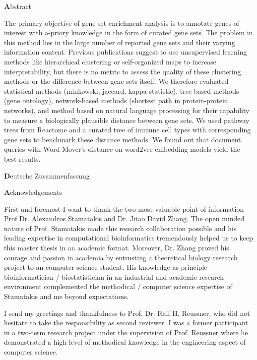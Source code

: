 \documentclass{thesisclass}
\begin{document}
\begin{addmargin}{0.5cm}

\centerline{\textbf Abstract}

The primary objective of gene set enrichment analysis is to annotate genes of interest with a-priory knowledge in the form of curated gene sets. The problem in this method lies in the large number of reported gene sets and their varying information content. Previous publications suggest to use unsupervised learning methods like hierarchical clustering or self-organized maps to increase interpretability, but there is no metric to assess the quality of these clustering methods or the difference between gene sets itself. We therefore evaluated statistical methods (minkowski, jaccard, kappa-statistic), tree-based methods (gene ontology), network-based methods (shortest path in protein-protein networks), and method based on natural language processing for their capability to measure a biologically plausible distance between gene sets. We used pathway trees from Reactome and a curated tree of immune cell types with corresponding gene sets to benchmark these distance methods.  We found out that document queries with Word Mover's distance on word2vec embedding models yield the best results. 

\vskip 2cm

\centerline{\textbf Deutsche Zusammenfassung}



\vskip 2cm

\newpage

\centerline{\textbf Acknowledgements}

First and foremost I want to thank the two most valuable point of information Prof Dr. Alexandros Stamatakis and Dr. Jitao David Zhang. The open minded nature of Prof. Stamatakis made this research collaboration possible and his leading expertise in computational bioinformatics tremendously helped us to keep this master thesis in an academic format. Moreover, Dr. Zhang proved his courage and passion in academia by entrusting a theoretical biology research project to an computer science student. His knowledge as principle bioinformatician / biostatistician in an industrial and academic research environment complemented the methodical / computer science expertise of Stamatakis and me beyond expectations.

I send my greetings and thankfulness to Prof. Dr. Ralf H. Reussner, who did not hesitate to take the responsibility as second reviewer. I was a former participant in a two-term research project under the supervision of Prof. Reussner where he demonstrated a high level of methodical knowledge in the engineering aspect of computer science. 


\end{addmargin}
\end{document}
